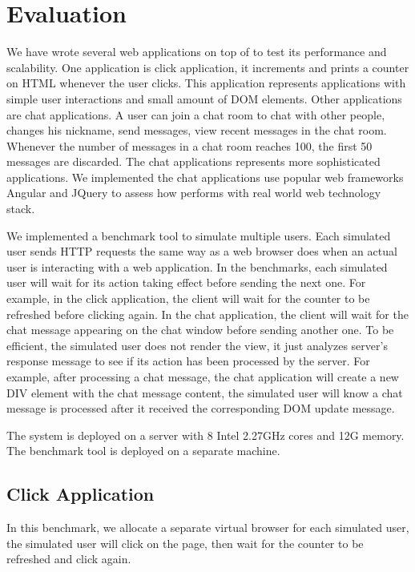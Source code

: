 \section{Evaluation}
\label{sec:eval}
We have wrote several web applications on top of \cb{} to test its
performance and scalability.
One application is click application,
it increments and prints a counter on HTML whenever the user clicks.
This application represents applications with simple user interactions and small amount of DOM elements.
Other applications are chat applications.
A user can join a chat room to chat with other people,
changes his nickname, send messages, view recent messages in the chat room.
Whenever the number of messages in a chat room reaches 100, the first 50 messages
are discarded.
The chat applications represents more sophisticated applications.
We implemented the chat applications use popular web frameworks Angular and JQuery
to assess how \cb{} performs with real world web technology stack.

\chatroomfig{}

We implemented a benchmark tool to simulate multiple users.
Each simulated user sends HTTP requests the same way as
a web browser does when an actual user is interacting with a web application.
In the benchmarks, each simulated user will wait for its action taking effect before 
sending the next one.
For example, in the click application, the client will wait for the counter
to be refreshed before clicking again.
In the chat application, the client will wait for
the chat message appearing on the chat window before sending another one.
To be efficient, the simulated user does not render the view, 
it just analyzes server's response message to see if its action has been processed by
the server.
For example, after processing a chat message, 
the chat application will create a new DIV element with the chat message content, 
the simulated user will know a chat message is processed after it received
the corresponding DOM update message.

The \cb{} system is deployed on a server with 8 Intel 2.27GHz cores and 12G memory.
The benchmark tool is deployed on a separate machine.

\subsection{Click Application}
In this benchmark,
we allocate a separate virtual browser for each simulated user,
the simulated user will click on the page, 
then wait for the counter to be refreshed and click again.

